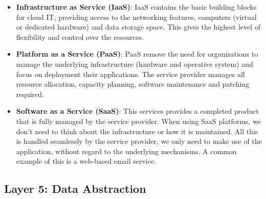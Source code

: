 \begin{itemize}
    \item \textbf{Infrastructure as Service (IaaS)}: IaaS contains the basic building blocks for cloud IT, providing access to the networking features, computers (virtual or dedicated hardware) and data storage space. This gives the highest level of flexibility and control over the resources.
    \item \textbf{Platform as a Service (PaaS)}: PaaS remove the need for organizations to manage the underlying infrastructure (hardware and operative system) and focus on deployment their applications. The service provider manages all resource allocation, capacity planning, software maintenance and patching required.
    \item \textbf{Software as a Service (SaaS)}: This services provides a completed product that is fully managed by the service provider. When using SaaS platforms, we don't need to think about the infrastructure or how it is maintained. All this is handled seamlessly by the service provider, we only need to make use of the application, without regard to the underlying mechanisms. A common example of this is a web-based email service. 
\end{itemize}

\subsection{Layer 5: Data Abstraction}
\label{sec:iot-model-layer5}



